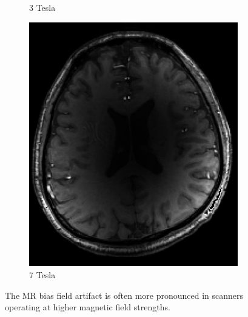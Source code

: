 \documentclass[10pt,twoside]{book}
\begin{document}
\begin{figure}
\begin{subfigure}[t]{0.33\textwidth}
    \caption{3 Tesla}
  \end{subfigure}
  \hspace{-1ex}
  \begin{subfigure}[t]{0.33\textwidth}
    \centering
    \includegraphics[height=\textwidth]{biasField7T}
    \caption{7 Tesla}
  \end{subfigure}
  \caption{The MR bias field artifact is often more pronounced in scanners operating at higher magnetic field strengths.}
  \label{fig:biasField}
\end{figure}
\end{document}
